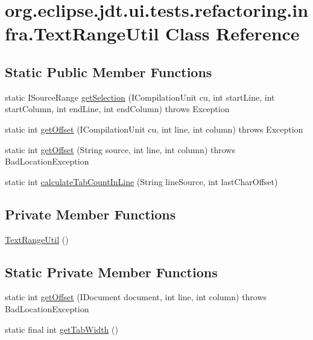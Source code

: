 \hypertarget{classorg_1_1eclipse_1_1jdt_1_1ui_1_1tests_1_1refactoring_1_1infra_1_1TextRangeUtil}{
\section{org.eclipse.jdt.ui.tests.refactoring.infra.TextRangeUtil Class Reference}
\label{classorg_1_1eclipse_1_1jdt_1_1ui_1_1tests_1_1refactoring_1_1infra_1_1TextRangeUtil}
}
\subsection*{Static Public Member Functions}
\begin{DoxyCompactItemize}
\item 
static ISourceRange \hyperlink{classorg_1_1eclipse_1_1jdt_1_1ui_1_1tests_1_1refactoring_1_1infra_1_1TextRangeUtil_a31e1312fd4f71552f4582fcb79e7d35d}{getSelection} (ICompilationUnit cu, int startLine, int startColumn, int endLine, int endColumn)  throws Exception 
\item 
static int \hyperlink{classorg_1_1eclipse_1_1jdt_1_1ui_1_1tests_1_1refactoring_1_1infra_1_1TextRangeUtil_a8af273d2ac02b3d43869c2f9cc94c210}{getOffset} (ICompilationUnit cu, int line, int column)  throws Exception 
\item 
static int \hyperlink{classorg_1_1eclipse_1_1jdt_1_1ui_1_1tests_1_1refactoring_1_1infra_1_1TextRangeUtil_aeb5b5f9034938d838e9521682c259839}{getOffset} (String source, int line, int column)  throws BadLocationException 
\item 
static int \hyperlink{classorg_1_1eclipse_1_1jdt_1_1ui_1_1tests_1_1refactoring_1_1infra_1_1TextRangeUtil_a53ad2a89fb408fba1c6cf2a8d406f300}{calculateTabCountInLine} (String lineSource, int lastCharOffset)
\end{DoxyCompactItemize}
\subsection*{Private Member Functions}
\begin{DoxyCompactItemize}
\item 
\hyperlink{classorg_1_1eclipse_1_1jdt_1_1ui_1_1tests_1_1refactoring_1_1infra_1_1TextRangeUtil_a7159ab0f39b37193075331eaa1e7d41f}{TextRangeUtil} ()
\end{DoxyCompactItemize}
\subsection*{Static Private Member Functions}
\begin{DoxyCompactItemize}
\item 
static int \hyperlink{classorg_1_1eclipse_1_1jdt_1_1ui_1_1tests_1_1refactoring_1_1infra_1_1TextRangeUtil_aa90bcb661e44b2c354a1ea20c990be66}{getOffset} (IDocument document, int line, int column)  throws BadLocationException 
\item 
static final int \hyperlink{classorg_1_1eclipse_1_1jdt_1_1ui_1_1tests_1_1refactoring_1_1infra_1_1TextRangeUtil_ab65f8d5363552c36f1a6a4e23612ea3d}{getTabWidth} ()
\end{DoxyCompactItemize}


